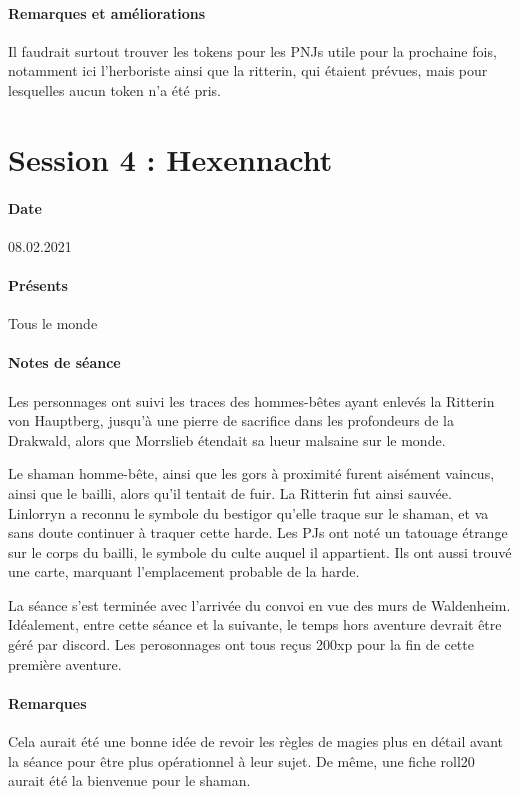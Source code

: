 \documentclass[10pt,a4paper]{book}
\begin{document}
\paragraph{Remarques et améliorations}
Il faudrait surtout trouver les tokens pour les PNJs utile pour la prochaine fois, notamment ici l'herboriste ainsi que la ritterin, qui étaient prévues, mais pour lesquelles aucun token n'a été pris.
\section{Session 4 : Hexennacht}
\paragraph{Date}08.02.2021
\paragraph{Présents} Tous le monde
\paragraph{Notes de séance}
Les personnages ont suivi les traces des hommes-bêtes ayant enlevés la Ritterin von Hauptberg, jusqu'à une pierre de sacrifice dans les profondeurs de la Drakwald, alors que Morrslieb étendait sa lueur malsaine sur le monde.

Le shaman homme-bête, ainsi que les gors à proximité furent aisément vaincus, ainsi que le bailli, alors qu'il tentait de fuir. La Ritterin fut ainsi sauvée. Linlorryn a reconnu le symbole du bestigor qu'elle traque sur le shaman, et va sans doute continuer à traquer cette harde. Les PJs ont noté un tatouage étrange sur le corps du bailli, le symbole du culte auquel il appartient. Ils ont aussi trouvé une carte, marquant l'emplacement probable de la harde.

La séance s'est terminée avec l'arrivée du convoi en vue des murs de Waldenheim. Idéalement, entre cette séance et la suivante, le temps hors aventure devrait être géré par discord. Les perosonnages ont tous reçus 200xp pour la fin de cette première aventure.

\paragraph{Remarques}
Cela aurait été une bonne idée de revoir les règles de magies plus en détail avant la séance pour être plus opérationnel à leur sujet. De même, une fiche roll20 aurait été la bienvenue pour le shaman.
\end{document}
